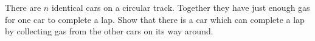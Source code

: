 There are $n$ identical cars on a circular track. Together they have just enough gas for one car to complete a lap. Show that there is a car which can complete a lap by collecting gas from the other cars on its way around.
